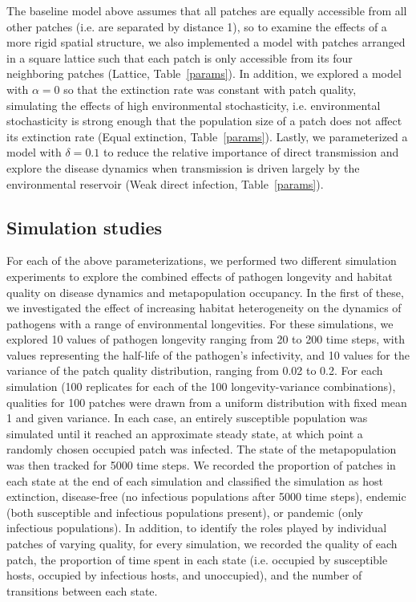\documentclass{svjour3}
\begin{document}
The baseline model above assumes that all patches are equally accessible from all other patches (i.e. are separated by distance 1), so to examine the effects of a more rigid spatial structure, we also implemented a model with patches arranged in a square lattice such that each patch is only accessible from its four neighboring patches (Lattice, Table~\ref{params}).  In addition, we explored a model with $\alpha = 0$ so that the extinction rate was constant with patch quality, simulating the effects of high environmental stochasticity, i.e. environmental stochasticity is strong enough that the population size of a patch does not affect its extinction rate (Equal extinction, Table~\ref{params}).  Lastly, we parameterized a model with $\delta = 0.1$ to reduce the relative importance of direct transmission and explore the disease dynamics when transmission is driven largely by the environmental reservoir (Weak direct infection, Table~\ref{params}). 

\subsection{Simulation studies}

For each of the above parameterizations, we performed two different simulation experiments to explore the combined effects of pathogen longevity and habitat quality on disease dynamics and metapopulation occupancy.  In the first of these, we investigated the effect of increasing habitat heterogeneity on the dynamics of pathogens with a range of environmental longevities.  For these simulations, we explored 10 values of pathogen longevity ranging from 20 to 200 time steps, with values representing the half-life of the pathogen's infectivity, and 10 values for the variance of the patch quality distribution, ranging from 0.02 to 0.2.  For each simulation (100 replicates for each of the 100 longevity-variance combinations), qualities for 100 patches were drawn from a uniform distribution with fixed mean 1 and given variance. In each case, an entirely susceptible population was simulated until it reached an approximate steady state, at which point a randomly chosen occupied patch was infected.  The state of the metapopulation was then tracked for 5000 time steps.  We recorded the proportion of patches in each state at the end of each simulation and classified the simulation as host extinction, disease-free (no infectious populations after 5000 time steps), endemic (both susceptible and infectious populations present), or pandemic (only infectious populations).  In addition, to identify the roles played by individual patches of varying quality, for every simulation, we recorded the quality of each patch, the proportion of time spent in each state (i.e. occupied by susceptible hosts, occupied by infectious hosts, and unoccupied), and the number of transitions between each state.  
\end{document}
